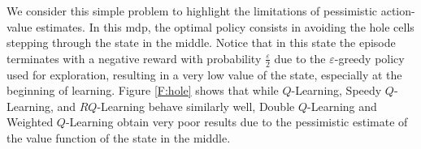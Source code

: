 We consider this simple problem to highlight the limitations of pessimistic action-value estimates. In this \gls{mdp}, the optimal policy consists in avoiding the hole cells stepping through the state in the middle. Notice that in this state the episode terminates with a negative reward with probability $\frac{\varepsilon}{2}$ due to the $\varepsilon$-greedy policy used for exploration, resulting in a very low value of the state, especially at the beginning of learning. Figure \ref{F:hole} shows that while $Q$-Learning, Speedy $Q$-Learning, and $RQ$-Learning behave similarly well, Double $Q$-Learning and Weighted $Q$-Learning obtain very poor results due to the pessimistic estimate of the value function of the state in the middle.
\begin{figure}[t]
\begin{minipage}{\columnwidth}
\centering

\end{minipage}
\end{figure}
